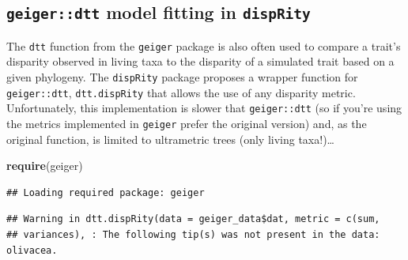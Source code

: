 \documentclass[]{book}
\newenvironment{Shaded}{\begin{snugshade}}{\end{snugshade}}
\newcommand{\KeywordTok}[1]{\textcolor[rgb]{0.13,0.29,0.53}{\textbf{#1}}}
\newcommand{\DataTypeTok}[1]{\textcolor[rgb]{0.13,0.29,0.53}{#1}}
\newcommand{\DecValTok}[1]{\textcolor[rgb]{0.00,0.00,0.81}{#1}}
\newcommand{\StringTok}[1]{\textcolor[rgb]{0.31,0.60,0.02}{#1}}
\newcommand{\OperatorTok}[1]{\textcolor[rgb]{0.81,0.36,0.00}{\textbf{#1}}}
\newcommand{\NormalTok}[1]{#1}
\theoremstyle{definition}
\theoremstyle{definition}
\theoremstyle{definition}
\theoremstyle{remark}
\begin{document}
\subsection{\texorpdfstring{\texttt{geiger::dtt} model fitting in
\texttt{dispRity}}{geiger::dtt model fitting in dispRity}}\label{geigerdtt-model-fitting-in-disprity}

The \texttt{dtt} function from the \texttt{geiger} package is also often
used to compare a trait's disparity observed in living taxa to the
disparity of a simulated trait based on a given phylogeny. The
\texttt{dispRity} package proposes a wrapper function for
\texttt{geiger::dtt}, \texttt{dtt.dispRity} that allows the use of any
disparity metric. Unfortunately, this implementation is slower that
\texttt{geiger::dtt} (so if you're using the metrics implemented in
\texttt{geiger} prefer the original version) and, as the original
function, is limited to ultrametric trees (only living taxa!)\ldots{}

\begin{Shaded}
\begin{Highlighting}[]
\KeywordTok{require}\NormalTok{(geiger)}
\end{Highlighting}
\end{Shaded}

\begin{verbatim}
## Loading required package: geiger
\end{verbatim}

\begin{Shaded}
\end{Shaded}

\begin{verbatim}
## Warning in dtt.dispRity(data = geiger_data$dat, metric = c(sum,
## variances), : The following tip(s) was not present in the data: olivacea.
\end{verbatim}
\end{document}
